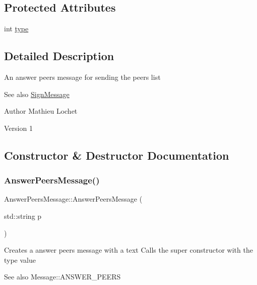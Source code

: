 \subsection*{Protected Attributes}
\begin{DoxyCompactItemize}
\item 
int \mbox{\hyperlink{classMessage_afbfb481c98b13d0deba0bac443bebe29}{type}}
\end{DoxyCompactItemize}


\subsection{Detailed Description}
An answer peers message for sending the peers list \begin{DoxySeeAlso}{See also}
\mbox{\hyperlink{classSignMessage}{Sign\+Message}}
\end{DoxySeeAlso}
\begin{DoxyAuthor}{Author}
Mathieu Lochet 
\end{DoxyAuthor}
\begin{DoxyVersion}{Version}
1 
\end{DoxyVersion}


\subsection{Constructor \& Destructor Documentation}
\mbox{\label{classAnswerPeersMessage_a9e187dfc2df64053694b5151db765eee}} 
\subsubsection{\texorpdfstring{Answer\+Peers\+Message()}{AnswerPeersMessage()}}
{\footnotesize\ttfamily Answer\+Peers\+Message\+::\+Answer\+Peers\+Message (\begin{DoxyParamCaption}\item[{std\+::string}]{p }\end{DoxyParamCaption})}

Creates a answer peers message with a text Calls the super constructor with the type value \begin{DoxySeeAlso}{See also}
Message\+::\+A\+N\+S\+W\+E\+R\+\_\+\+P\+E\+E\+RS
\end{DoxySeeAlso}

